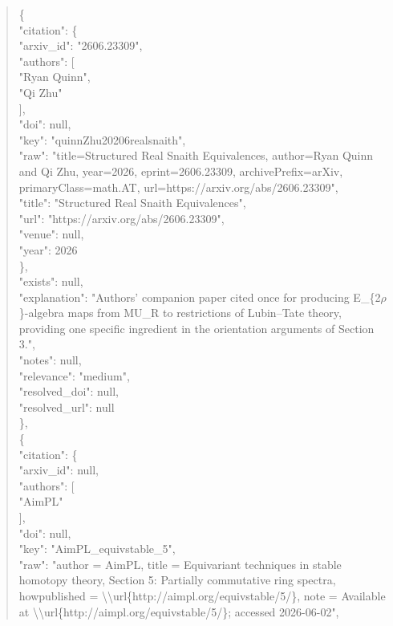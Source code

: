 \documentclass[11pt]{article}
\begin{document}
\begin{quote}
    \{\\
      "citation": \{\\
        "arxiv\_id": "2606.23309",\\
        "authors": [\\
          "Ryan Quinn",\\
          "Qi Zhu"\\
        ],\\
        "doi": null,\\
        "key": "quinnZhu20206realsnaith",\\
        "raw": "title=Structured Real Snaith Equivalences, author=Ryan Quinn and Qi Zhu, year=2026, eprint=2606.23309, archivePrefix=arXiv, primaryClass=math.AT, url=https://arxiv.org/abs/2606.23309",\\
        "title": "Structured Real Snaith Equivalences",\\
        "url": "https://arxiv.org/abs/2606.23309",\\
        "venue": null,\\
        "year": 2026\\
      \},\\
      "exists": null,\\
      "explanation": "Authors' companion paper cited once for producing E\_\{2\ensuremath{\rho}\}-algebra maps from MU\_R to restrictions of Lubin--Tate theory, providing one specific ingredient in the orientation arguments of Section 3.",\\
      "notes": null,\\
      "relevance": "medium",\\
      "resolved\_doi": null,\\
      "resolved\_url": null\\
    \},\\
    \{\\
      "citation": \{\\
        "arxiv\_id": null,\\
        "authors": [\\
          "AimPL"\\
        ],\\
        "doi": null,\\
        "key": "AimPL\_equivstable\_5",\\
        "raw": "author = AimPL, title = Equivariant techniques in stable homotopy theory, Section 5: Partially commutative ring spectra, howpublished = \textbackslash{}\textbackslash{}url\{http://aimpl.org/equivstable/5/\}, note = Available at \textbackslash{}\textbackslash{}url\{http://aimpl.org/equivstable/5/\}; accessed 2026-06-02",\\

\end{quote}
\end{document}
